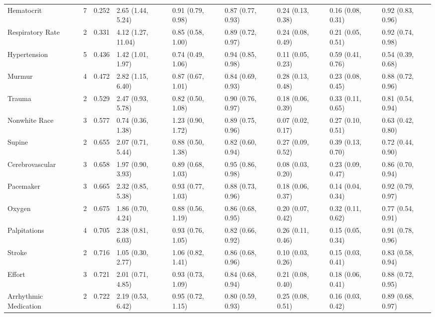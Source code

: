 \begin{table}[ht]
\begin{tabular}{lrrllllll}
  Hematocrit &    7 & 0.252 & 2.65 (1.44, 5.24) & 0.91 (0.79, 0.98) & 0.87 (0.77, 0.93) & 0.24 (0.13, 0.38) & 0.16 (0.08, 0.31) & 0.92 (0.83, 0.96) \\ 
  Respiratory Rate &    2 & 0.331 & 4.12 (1.27, 11.04) & 0.85 (0.58, 1.00) & 0.89 (0.72, 0.97) & 0.24 (0.08, 0.49) & 0.21 (0.05, 0.51) & 0.92 (0.74, 0.98) \\ 
  Hypertension &    5 & 0.436 & 1.42 (1.01, 1.97) & 0.74 (0.49, 1.06) & 0.94 (0.85, 0.98) & 0.11 (0.05, 0.23) & 0.59 (0.41, 0.76) & 0.54 (0.39, 0.68) \\ 
  Murmur &    4 & 0.472 & 2.82 (1.15, 6.40) & 0.87 (0.67, 1.01) & 0.84 (0.69, 0.93) & 0.28 (0.13, 0.48) & 0.23 (0.08, 0.45) & 0.88 (0.72, 0.96) \\ 
  Trauma &    2 & 0.529 & 2.47 (0.93, 5.78) & 0.82 (0.50, 1.08) & 0.90 (0.76, 0.97) & 0.18 (0.06, 0.39) & 0.33 (0.11, 0.65) & 0.81 (0.54, 0.94) \\ 
  Nonwhite Race &    3 & 0.577 & 0.74 (0.36, 1.38) & 1.23 (0.90, 1.72) & 0.89 (0.75, 0.96) & 0.07 (0.02, 0.17) & 0.27 (0.10, 0.51) & 0.63 (0.42, 0.80) \\ 
  Supine &    2 & 0.655 & 2.07 (0.71, 5.44) & 0.88 (0.50, 1.38) & 0.82 (0.60, 0.94) & 0.27 (0.09, 0.52) & 0.39 (0.13, 0.70) & 0.72 (0.44, 0.90) \\ 
  Cerebrovascular &    3 & 0.658 & 1.97 (0.90, 3.93) & 0.89 (0.68, 1.03) & 0.95 (0.86, 0.98) & 0.08 (0.03, 0.20) & 0.23 (0.09, 0.47) & 0.86 (0.70, 0.94) \\ 
  Pacemaker &    3 & 0.665 & 2.32 (0.85, 5.38) & 0.93 (0.77, 1.03) & 0.88 (0.73, 0.96) & 0.18 (0.06, 0.37) & 0.14 (0.04, 0.34) & 0.92 (0.79, 0.97) \\ 
  Oxygen &    2 & 0.675 & 1.86 (0.70, 4.24) & 0.88 (0.56, 1.19) & 0.86 (0.68, 0.95) & 0.20 (0.07, 0.42) & 0.32 (0.11, 0.62) & 0.77 (0.54, 0.91) \\ 
  Palpitations &    4 & 0.705 & 2.38 (0.81, 6.03) & 0.93 (0.76, 1.05) & 0.82 (0.66, 0.92) & 0.26 (0.11, 0.46) & 0.15 (0.05, 0.34) & 0.91 (0.78, 0.96) \\ 
  Stroke &    2 & 0.716 & 1.05 (0.30, 2.77) & 1.06 (0.82, 1.41) & 0.86 (0.68, 0.96) & 0.10 (0.03, 0.26) & 0.15 (0.03, 0.41) & 0.83 (0.58, 0.94) \\ 
  Effort &    3 & 0.721 & 2.01 (0.71, 4.85) & 0.93 (0.73, 1.09) & 0.84 (0.68, 0.94) & 0.21 (0.08, 0.40) & 0.18 (0.06, 0.41) & 0.88 (0.72, 0.95) \\ 
  Arrhythmic Medication &    2 & 0.722 & 2.19 (0.53, 6.42) & 0.95 (0.72, 1.15) & 0.80 (0.59, 0.93) & 0.25 (0.08, 0.51) & 0.16 (0.03, 0.42) & 0.89 (0.68, 0.97) \\ 

\end{tabular}
\end{table}
